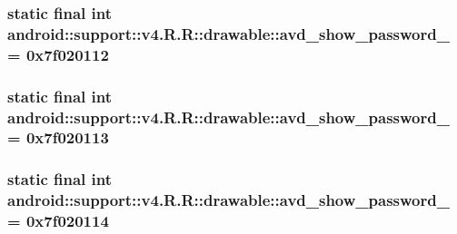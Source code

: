 \hypertarget{classandroid_1_1support_1_1v4_1_1_r_1_1drawable_d8aa07a42f934f5ef98f11551887b253}{
\subsubsection[{avd\_\-show\_\-password\_\-1}]{\setlength{\rightskip}{0pt plus 5cm}static final int android::support::v4.R.R::drawable::avd\_\-show\_\-password\_ = 0x7f020112}}
\label{classandroid_1_1support_1_1v4_1_1_r_1_1drawable_d8aa07a42f934f5ef98f11551887b253}


\hypertarget{classandroid_1_1support_1_1v4_1_1_r_1_1drawable_4663d387716f8c87abb50fc782c985ef}{
\subsubsection[{avd\_\-show\_\-password\_\-2}]{\setlength{\rightskip}{0pt plus 5cm}static final int android::support::v4.R.R::drawable::avd\_\-show\_\-password\_ = 0x7f020113}}
\label{classandroid_1_1support_1_1v4_1_1_r_1_1drawable_4663d387716f8c87abb50fc782c985ef}


\hypertarget{classandroid_1_1support_1_1v4_1_1_r_1_1drawable_f0a10e65985712f924a63bf02a3931ca}{
\subsubsection[{avd\_\-show\_\-password\_\-3}]{\setlength{\rightskip}{0pt plus 5cm}static final int android::support::v4.R.R::drawable::avd\_\-show\_\-password\_ = 0x7f020114}}
\label{classandroid_1_1support_1_1v4_1_1_r_1_1drawable_f0a10e65985712f924a63bf02a3931ca}


